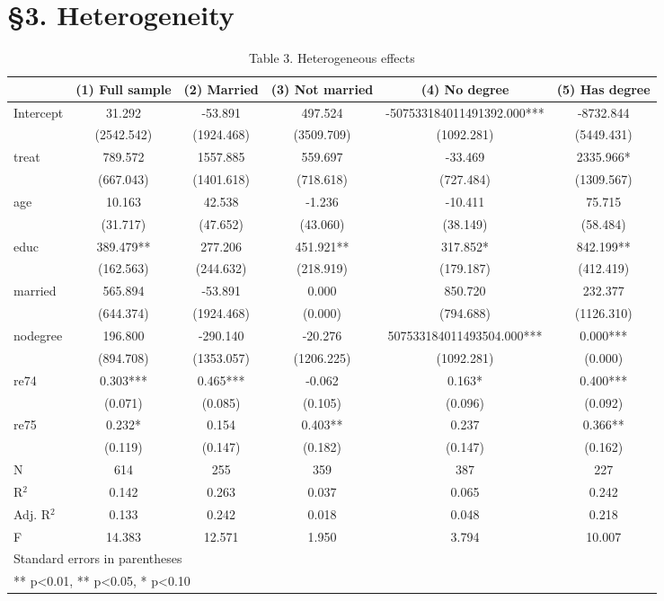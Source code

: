 \section{§3. Heterogeneity}

\begin{table}[htbp]
\centering
\caption{Table 3. Heterogeneous effects}
\begin{tabular}{lccccc}
\hline\hline
 & (1) Full sample & (2) Married & (3) Not married & (4) No degree & (5) Has degree \\
\hline
Intercept & 31.292 & -53.891 & 497.524 & -507533184011491392.000*** & -8732.844 \\
 & (2542.542) & (1924.468) & (3509.709) & (1092.281) & (5449.431) \\
treat & 789.572 & 1557.885 & 559.697 & -33.469 & 2335.966* \\
 & (667.043) & (1401.618) & (718.618) & (727.484) & (1309.567) \\
age & 10.163 & 42.538 & -1.236 & -10.411 & 75.715 \\
 & (31.717) & (47.652) & (43.060) & (38.149) & (58.484) \\
educ & 389.479** & 277.206 & 451.921** & 317.852* & 842.199** \\
 & (162.563) & (244.632) & (218.919) & (179.187) & (412.419) \\
married & 565.894 & -53.891 & 0.000 & 850.720 & 232.377 \\
 & (644.374) & (1924.468) & (0.000) & (794.688) & (1126.310) \\
nodegree & 196.800 & -290.140 & -20.276 & 507533184011493504.000*** & 0.000*** \\
 & (894.708) & (1353.057) & (1206.225) & (1092.281) & (0.000) \\
re74 & 0.303*** & 0.465*** & -0.062 & 0.163* & 0.400*** \\
 & (0.071) & (0.085) & (0.105) & (0.096) & (0.092) \\
re75 & 0.232* & 0.154 & 0.403** & 0.237 & 0.366** \\
 & (0.119) & (0.147) & (0.182) & (0.147) & (0.162) \\
\hline
N & 614 & 255 & 359 & 387 & 227 \\
R$^2$ & 0.142 & 0.263 & 0.037 & 0.065 & 0.242 \\
Adj. R$^2$ & 0.133 & 0.242 & 0.018 & 0.048 & 0.218 \\
F & 14.383 & 12.571 & 1.950 & 3.794 & 10.007 \\
\hline\hline
\multicolumn{6}{l}{\footnotesize Standard errors in parentheses} \\
\multicolumn{6}{l}{\footnotesize *** p<0.01, ** p<0.05, * p<0.10} \\
\end{tabular}
\end{table}

